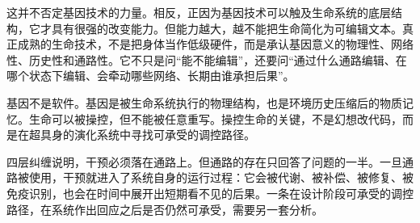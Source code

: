 这并不否定基因技术的力量。相反，正因为基因技术可以触及生命系统的底层结构，它才具有很强的改变能力。但能力越大，越不能把生命简化为可编辑文本。真正成熟的生命技术，不是把身体当作低级硬件，而是承认基因意义的物理性、网络性、历史性和通路性。它不只是问“能不能编辑”，还要问“通过什么通路编辑、在哪个状态下编辑、会牵动哪些网络、长期由谁承担后果”。

基因不是软件。基因是被生命系统执行的物理结构，也是环境历史压缩后的物质记忆。生命可以被操控，但不能被任意重写。操控生命的关键，不是幻想改代码，而是在超具身的演化系统中寻找可承受的调控路径。

四层纠缠说明，干预必须落在通路上。但通路的存在只回答了问题的一半。一旦通路被使用，干预就进入了系统自身的运行过程：它会被代谢、被补偿、被修复、被免疫识别，也会在时间中展开出短期看不见的后果。一条在设计阶段可承受的调控路径，在系统作出回应之后是否仍然可承受，需要另一套分析。
